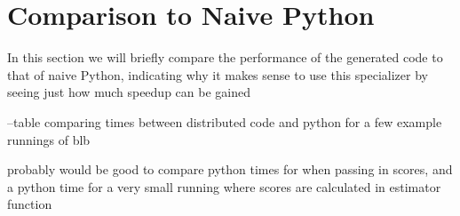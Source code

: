 \section{Comparison to Naive Python}

In this section we will briefly compare the performance of the generated code to that of naive Python, indicating why it makes sense to use this specializer by seeing just how much speedup can be gained 

--table comparing times between distributed code and python for a few example runnings of blb  

probably would be good to compare python times for when passing in scores, 
and a python time for a very small running where scores are calculated in estimator function 

